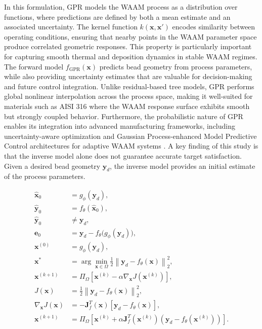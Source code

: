 \documentclass[11pt]{article}
\begin{document}
In this formulation, GPR models the WAAM process as a distribution over functions, where predictions are defined by both a mean estimate and an associated uncertainty. The kernel function $k(\mathbf{x},\mathbf{x}')$ encodes similarity between operating conditions, ensuring that nearby points in the WAAM parameter space produce correlated geometric responses. This property is particularly important for capturing smooth thermal and deposition dynamics in stable WAAM regimes. The forward model $f_{\mathrm{GPR}}(\mathbf{x})$ predicts bead geometry from process parameters, while also providing uncertainty estimates that are valuable for decision-making and future control integration. Unlike residual-based tree models, GPR performs global nonlinear interpolation across the process space, making it well-suited for materials such as AISI 316 where the WAAM response surface exhibits smooth but strongly coupled behavior. Furthermore, the probabilistic nature of GPR enables its integration into advanced manufacturing frameworks, including uncertainty-aware optimization and Gaussian Process-enhanced Model Predictive Control architectures for adaptive WAAM systems \cite{Regal2025}. A key finding of this study is that the inverse model alone does not guarantee accurate target satisfaction. Given a desired bead geometry $\mathbf{y}_d$, the inverse model provides an initial estimate of the process parameters.

\begin{tcolorbox}[colback=white,colframe=black,boxrule=0.5pt,arc=2pt]
\begin{equation}
\begin{aligned}
\hat{\mathbf{x}}_0 &= g_{\phi}(\mathbf{y}_d), \\
\hat{\mathbf{y}}_0 &= f_{\theta}(\hat{\mathbf{x}}_0), \\
\hat{\mathbf{y}}_0 &\neq \mathbf{y}_d, \\
\mathbf{e}_0 &= \mathbf{y}_d - f_{\theta}\big(g_{\phi}(\mathbf{y}_d)\big), \\
\mathbf{x}^{(0)} &= g_{\phi}(\mathbf{y}_d), \\
\mathbf{x}^{*} &= \arg\min_{\mathbf{x}\in\Omega} \frac{1}{2}
\left\| \mathbf{y}_d - f_{\theta}(\mathbf{x}) \right\|_2^2, \\
\mathbf{x}^{(k+1)} &= \Pi_{\Omega}
\left[
\mathbf{x}^{(k)} - \alpha \nabla_{\mathbf{x}}J(\mathbf{x}^{(k)})
\right], \\
J(\mathbf{x}) &= \frac{1}{2}
\left\| \mathbf{y}_d - f_{\theta}(\mathbf{x}) \right\|_2^2, \\
\nabla_{\mathbf{x}}J(\mathbf{x}) &= -\mathbf{J}_{f}^{T}(\mathbf{x})
\left[ \mathbf{y}_d - f_{\theta}(\mathbf{x}) \right], \\
\mathbf{x}^{(k+1)} &= \Pi_{\Omega}
\left[
\mathbf{x}^{(k)} + \alpha \mathbf{J}_{f}^{T}(\mathbf{x}^{(k)})
\left( \mathbf{y}_d - f_{\theta}(\mathbf{x}^{(k)}) \right)
\right].
\end{aligned}
\end{equation}
\end{tcolorbox}
\end{document}
